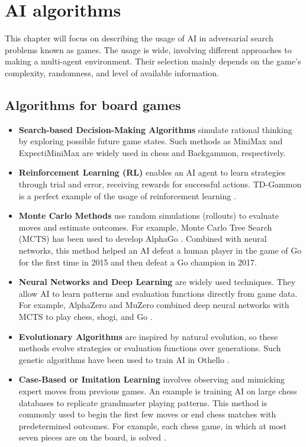 \chapter{AI algorithms}\label{AI algorithms}
This chapter will focus on describing the usage of AI in adversarial search problems known as games. The usage is wide, involving different approaches to making a multi-agent environment. Their selection mainly depends on the game's complexity, randomness, and level of available information.
\section{Algorithms for board games}

\begin{itemize} \item \textbf{Search-based Decision-Making Algorithms} simulate rational thinking by exploring possible future game states.
Such methods as MiniMax and ExpectiMiniMax are widely used in chess and Backgammon, respectively.

\item \textbf{Reinforcement Learning (RL)} enables an AI agent to learn strategies through trial and error, receiving rewards for successful actions. TD-Gammon is a perfect example of the usage of reinforcement learning \cite{Temporal_Difference}.

\item \textbf{Monte Carlo Methods} use random simulations (rollouts) to evaluate moves and estimate outcomes. For example, Monte Carlo Tree Search (MCTS) has been used to develop AlphaGo \cite{brunner2019mastering}. Combined with neural networks, this method helped an AI defeat a human player in the game of Go for the first time in 2015 and then defeat a Go champion in 2017.

\item \textbf{Neural Networks and Deep Learning} are widely used techniques. They allow AI to learn patterns and evaluation functions directly from game data. For example, AlphaZero and MuZero combined deep neural networks with MCTS to play chess, shogi, and Go \cite{AlphaMuZero}.

\item \textbf{Evolutionary Algorithms} are inspired by natural evolution, so these methods evolve strategies or evaluation functions over generations. Such genetic algorithms have been used to train AI in Othello \cite{Lai2006ApplyingGA}.

\item \textbf{Case-Based or Imitation Learning} involves observing and mimicking expert moves from previous games. An example is training AI on large chess databases to replicate grandmaster playing patterns. This method is commonly used to begin the first few moves or end chess matches with predetermined outcomes. For example, each chess game, in which at most seven pieces are on the board, is solved \cite{syzygy}. \end{itemize}

